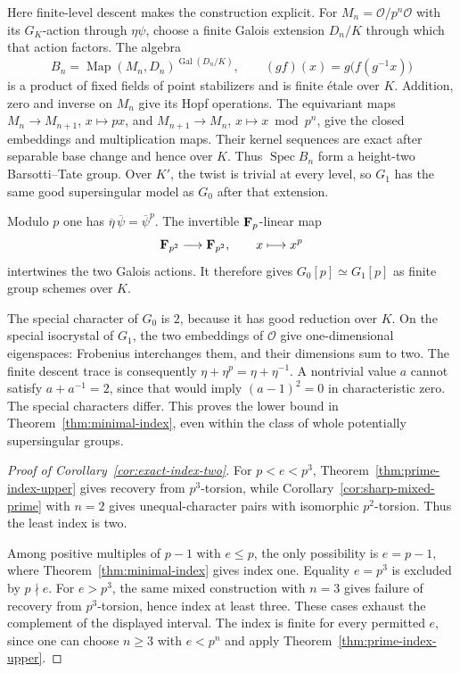 Here finite-level descent makes the construction explicit. For $M_n=\mathcal O/p^n\mathcal O$ with its $G_K$-action through $\eta\psi$, choose a finite Galois extension $D_n/K$ through which that action factors. The algebra
\[
 B_n=\operatorname{Map}(M_n,D_n)^{\operatorname{Gal}(D_n/K)},
 \qquad (gf)(x)=g\bigl(f(g^{-1}x)\bigr)
\]
is a product of fixed fields of point stabilizers and is finite \'etale over $K$. Addition, zero and inverse on $M_n$ give its Hopf operations. The equivariant maps $M_n\to M_{n+1}$, $x\mapsto px$, and $M_{n+1}\to M_n$, $x\mapsto x\bmod p^n$, give the closed embeddings and multiplication maps. Their kernel sequences are exact after separable base change and hence over $K$. Thus $\operatorname{Spec}B_n$ form a height-two Barsotti--Tate group. Over $K'$, the twist is trivial at every level, so $G_1$ has the same good supersingular model as $G_0$ after that extension.

Modulo $p$ one has $\overline\eta\,\overline\psi=\overline\psi^{p}$. The invertible $\mathbf F_p$-linear map
\[
                  \mathbf F_{p^2}\longrightarrow\mathbf F_{p^2},
                         \qquad x\longmapsto x^p
\]
intertwines the two Galois actions. It therefore gives $G_0[p]\simeq G_1[p]$ as finite group schemes over $K$.

The special character of $G_0$ is $2$, because it has good reduction over $K$. On the special isocrystal of $G_1$, the two embeddings of $\mathcal O$ give one-dimensional eigenspaces: Frobenius interchanges them, and their dimensions sum to two. The finite descent trace is consequently $\eta+\eta^p=\eta+\eta^{-1}$. A nontrivial value $a$ cannot satisfy $a+a^{-1}=2$, since that would imply $(a-1)^2=0$ in characteristic zero. The special characters differ. This proves the lower bound in Theorem~\ref{thm:minimal-index}, even within the class of whole potentially supersingular groups.

\begin{proof}[Proof of Corollary~\ref{cor:exact-index-two}]
For $p<e<p^3$, Theorem~\ref{thm:prime-index-upper} gives recovery from $p^3$-torsion, while Corollary~\ref{cor:sharp-mixed-prime} with $n=2$ gives unequal-character pairs with isomorphic $p^2$-torsion. Thus the least index is two.

Among positive multiples of $p-1$ with $e\le p$, the only possibility is $e=p-1$, where Theorem~\ref{thm:minimal-index} gives index one. Equality $e=p^3$ is excluded by $p\nmid e$. For $e>p^3$, the same mixed construction with $n=3$ gives failure of recovery from $p^3$-torsion, hence index at least three. These cases exhaust the complement of the displayed interval. The index is finite for every permitted $e$, since one can choose $n\ge3$ with $e<p^n$ and apply Theorem~\ref{thm:prime-index-upper}.
\end{proof}
